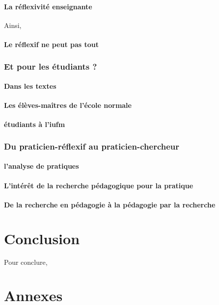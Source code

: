 \documentclass[a4paper,11pt]{article}
\begin{document}
			\subsection{La réflexivité enseignante}
			Ainsi, 
			
			\subsection{Le réflexif ne peut pas tout}


\section{Et pour les étudiants ?}

			\subsection{Dans les textes}
			\subsection{Les élèves-maîtres de l'école normale}
			\subsection{étudiants à l'iufm}
			
\section{Du praticien-réflexif au praticien-chercheur}

			\subsection{l'analyse de pratiques}
			\subsection{L'intérêt de la recherche pédagogique pour la pratique}
			\subsection{De la recherche en pédagogie à la pédagogie par la recherche}



\part*{Conclusion}
Pour conclure,


\part*{Annexes}
\label{annexe1}

\nocite{*}


\end{document}
